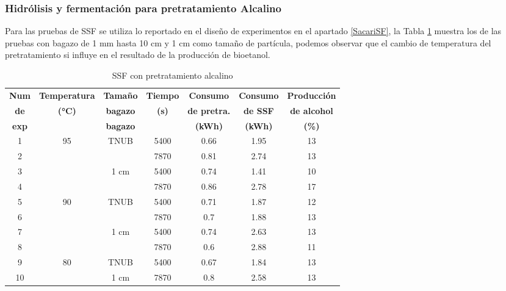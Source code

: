 \documentclass[12pt]{article}
\begin{document}
		\subsubsection{ Hidrólisis y fermentación para pretratamiento Alcalino}
		
		Para las pruebas de SSF se utiliza lo reportado en el diseño de experimentos en el apartado \ref{SacariSF}, la Tabla \ref{ssf con Pretratamiento Alcalino}  muestra los de las pruebas con bagazo de 1 mm hasta 10 cm y 1 cm como tamaño de partícula, podemos observar que el cambio de temperatura del pretratamiento si influye en el resultado de la producción de bioetanol.
		
		
		\begin{table}[H]
			\centering
			\caption{SSF con pretratamiento alcalino}
			\begin{tabular}{|c|c|c|c|c|c|c|}
				\hline
				\textbf{Num} & \textbf{Temperatura} & \textbf{Tamaño} & \textbf{Tiempo} & \textbf{Consumo } & \textbf{Consumo } & \textbf{Producción } \\
			\textbf{de}	&\textbf{ (°C)}& \textbf{bagazo}&\textbf{(s)}	&\textbf{de pretra. }&\textbf{ de SSF}&\textbf{ de alcohol}\\ 
				\textbf{exp}	& & \textbf{bagazo}&	&\textbf{ (kWh)}&\textbf{ (kWh)}&\textbf{ (\%)}\\ \hline
			
			
				1 & \multirow{4}{*}{95} & \multirow{2}{*}{TNUB} & 5400 &0.66& 1.95 & 13 \\ \cline{1-1} \cline{4-6}
				2 &                     &                       & 7870 &0.81& 2.74 & 13 \\ \cline{3-6}  \cline{1-1}
				3 &                     &\multirow{2}{*}{1 cm}  & 5400 &0.74& 1.41 & 10 \\ \cline{4-6}  \cline{1-1}
				4 &                     &                       & 7870 &0.86& 2.78 & 17 \\ \hline
				5 & \multirow{4}{*}{90} & \multirow{2}{*}{TNUB} & 5400 &0.71& 1.87 & 12 \\  \cline{1-1} \cline{4-6}
				6 &                     &                       & 7870 &0.7& 1.88 & 13 \\ \cline{1-1} \cline{3-6}
				7 &                     & \multirow{2}{*}{1 cm} & 5400 &0.74& 2.63 & 13 \\ \cline{1-1} \cline{4-6}
				8 &                     &                       & 7870 & 0.6&2.88 & 11 \\ \hline
				9 &\multirow{2}{*}{80 } & TNUB                  & 5400 &0.67 &1.84 & 13 \\ \cline{1-1} \cline{3-6}
				10 &                     & 1 cm                 & 7870 & 0.8&2.58 & 13 \\ \hline
			\end{tabular}
			\label{ssf con Pretratamiento Alcalino}
		\end{table}
		
\end{document}
